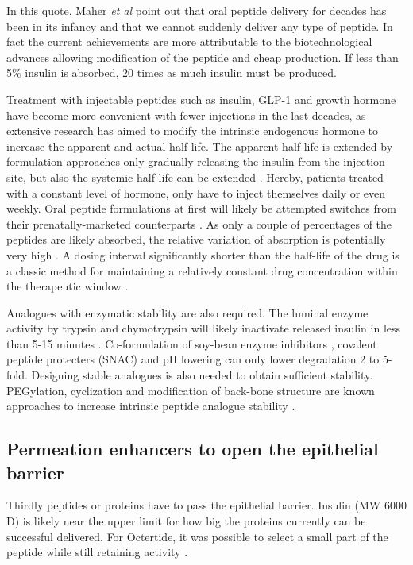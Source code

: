 In this quote, Maher \textit{et al} point out that oral peptide delivery for decades has been in its infancy and that we cannot suddenly deliver any type of peptide. In fact the current achievements are more attributable to the biotechnological advances allowing modification of the peptide and cheap production. If less than 5\% insulin is absorbed, 20 times as much insulin must be produced.

Treatment with injectable peptides such as insulin, GLP-1 and growth hormone have become more convenient with fewer injections in the last decades, as extensive research has aimed to modify the intrinsic endogenous hormone to increase the apparent and actual half-life. The apparent half-life is extended by formulation approaches only gradually releasing the insulin from the injection site, but also the systemic half-life can be extended \cite{arnolds2010pharmacokinetic}. Hereby, patients treated with a constant level of hormone, only have to inject themselves daily or even weekly. Oral peptide formulations at first will likely be attempted switches from their prenatally-marketed counterparts \cite{maher2014formulation}. As only a couple of percentages of the peptides are likely absorbed, the relative variation of absorption is potentially very high \cite{gabor2010improving}. A dosing interval significantly shorter than the half-life of the drug is a classic method for maintaining a relatively constant drug concentration within the therapeutic window \cite{tozer2006introduction}.

Analogues with enzymatic stability are also required. The luminal enzyme activity by trypsin and chymotrypsin will likely inactivate released insulin in less than 5-15 minutes \cite{welling2014citric}. Co-formulation of soy-bean enzyme inhibitors \cite{fujii1985promoting}, covalent peptide protecters (SNAC) \cite{bruno2013basics} and pH lowering \cite{welling2014citric} can only lower degradation 2 to 5-fold. Designing stable analogues is also needed to obtain sufficient stability. PEGylation, cyclization and modification of back-bone structure are known approaches to increase intrinsic peptide analogue stability \cite{bruno2013basics}.

\subsection{Permeation enhancers to open the epithelial barrier}
Thirdly peptides or proteins have to pass the epithelial barrier. Insulin (MW 6000 D) is likely near the upper limit for how big the proteins currently can be successful delivered. For Octertide, it was possible to select a small part of the peptide while still retaining activity \cite{aguiree2013idf}. 

